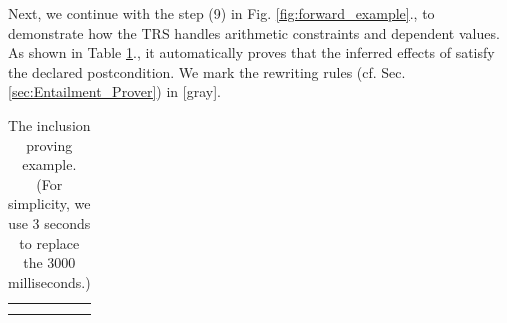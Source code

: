 \documentclass[acmsmall,review,anonymous]{acmart}\settopmatter{printfolios=true,printccs=false,printacmref=false}
\newcommand{\effect}{\textcolor{black}{\ensuremath{\mathrm{\Phi}}}}
\newcommand{\anyevent}[1]{{\textcolor{darkred}
{\underline{\textbf{\footnotesize #1}}}}}
\newcommand{\code}[1]{{\tt{\ensuremath{\m{#1}}}}}
\newcommand{\m}{\mathit}
\newcommand\figref[1]{Fig. \textcolor{black}{\ref{#1}}.}
\newcommand\tabref[1]{Table \textcolor{black}{\ref{#1}}.}
\newcommand\secref[1]{Sec. \textcolor{black}{\ref{#1}}}
\begin{document}
{%




Next, we continue with the step (9) in \figref{fig:forward_example}, to 
demonstrate how the TRS handles arithmetic constraints and dependent values. 
As shown in \tabref{tab:rewriting_tree_send}, it automatically proves that the inferred effects of {}
 satisfy the declared postcondition. 
We mark the rewriting rules (cf. \secref{sec:Entailment_Prover}) in \textcolor{mGray}{[gray]}.

{
\begin{table}[h]
\centering
      \vspace{0mm}
\caption{\label{tab:rewriting_tree_send} The inclusion proving example. (For simplicity, we use 3 seconds to replace the 3000 milliseconds.)}
      
\vspace{-1mm}
\begin{adjustbox}{width=1\textwidth}
 \Large\begin{tabular}[t]{l}
  \hline\\
{

}
\end{tabular}
\end{adjustbox}
\end{table}}}
\end{document}
